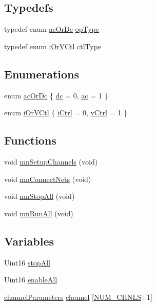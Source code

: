 \subsection*{Typedefs}
\begin{DoxyCompactItemize}
\item 
typedef enum \hyperlink{a00020_a067edf486f2115dfa74e51ce43cfdfa6}{ac\-Or\-Dc} \hyperlink{a00020_acd90d47e6937efc4183ab0d18f787575}{op\-Type}
\item 
typedef enum \hyperlink{a00020_a717a050513c9f1668fa40e08c4d5e78f}{i\-Or\-V\-Ctl} \hyperlink{a00020_a5cd368998e9721e657fd7bc6d413807a}{ctl\-Type}
\end{DoxyCompactItemize}
\subsection*{Enumerations}
\begin{DoxyCompactItemize}
\item 
enum \hyperlink{a00020_a067edf486f2115dfa74e51ce43cfdfa6}{ac\-Or\-Dc} \{ \hyperlink{a00020_a067edf486f2115dfa74e51ce43cfdfa6a22e2e72997ac4289587cadae38cc561e}{dc} = 0, 
\hyperlink{a00020_a067edf486f2115dfa74e51ce43cfdfa6ae13614f9b874b4bbeb45317b280ae5f0}{ac} = 1
 \}
\item 
enum \hyperlink{a00020_a717a050513c9f1668fa40e08c4d5e78f}{i\-Or\-V\-Ctl} \{ \hyperlink{a00020_a717a050513c9f1668fa40e08c4d5e78fad6554a2c0fc85e1b2dd381d6802c9052}{i\-Ctrl} = 0, 
\hyperlink{a00020_a717a050513c9f1668fa40e08c4d5e78fa0ea2edd69d870d99d3d8c102cd058383}{v\-Ctrl} = 1
 \}
\end{DoxyCompactItemize}
\subsection*{Functions}
\begin{DoxyCompactItemize}
\item 
void \hyperlink{a00020_ab787ed8809b8f3c22f698937c4f06fd7}{mn\-Setup\-Channels} (void)
\item 
void \hyperlink{a00020_a06d36d85b8d9d27cfc6674244ef1e603}{mn\-Connect\-Nets} (void)
\item 
void \hyperlink{a00020_ab9e9d895e2dd716625fbd464e944071c}{mn\-Stop\-All} (void)
\item 
void \hyperlink{a00020_a1e41564c4405fd553d1fed9cb2dbdda5}{mn\-Run\-All} (void)
\end{DoxyCompactItemize}
\subsection*{Variables}
\begin{DoxyCompactItemize}
\item 
Uint16 \hyperlink{a00020_ac9eb1cb01cb0229168d4277ac4c08295}{stop\-All}
\item 
Uint16 \hyperlink{a00020_a002da2ac651ab8bfc5755c0cd454a64f}{enable\-All}
\item 
\hyperlink{a00003}{channel\-Parameters} \hyperlink{a00020_a8d5dc394c7de43ab47a4f709a03331b9}{channel} \mbox{[}\hyperlink{a00030_afe433b138bb71d8d26b6e0907e656d1b}{N\-U\-M\-\_\-\-C\-H\-N\-L\-S}+1\mbox{]}
\end{DoxyCompactItemize}


